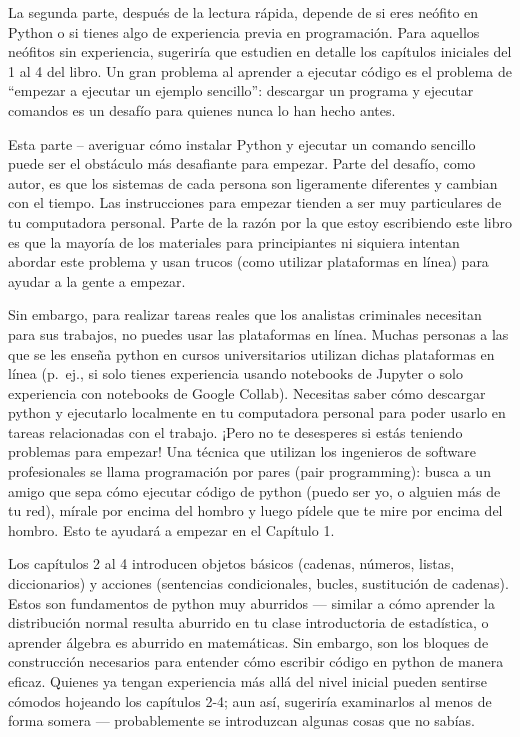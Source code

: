 \documentclass[
  letterpaper,
]{scrbook}
\begin{document}
La segunda parte, después de la lectura rápida, depende de si eres
neófito en Python o si tienes algo de experiencia previa en
programación. Para aquellos neófitos sin experiencia, sugeriría que
estudien en detalle los capítulos iniciales del 1 al 4 del libro. Un
gran problema al aprender a ejecutar código es el problema de ``empezar
a ejecutar un ejemplo sencillo'': descargar un programa y ejecutar
comandos es un desafío para quienes nunca lo han hecho antes.

Esta parte -- averiguar cómo instalar Python y ejecutar un comando
sencillo puede ser el obstáculo más desafiante para empezar. Parte del
desafío, como autor, es que los sistemas de cada persona son ligeramente
diferentes y cambian con el tiempo. Las instrucciones para empezar
tienden a ser muy particulares de tu computadora personal. Parte de la
razón por la que estoy escribiendo este libro es que la mayoría de los
materiales para principiantes ni siquiera intentan abordar este problema
y usan trucos (como utilizar plataformas en línea) para ayudar a la
gente a empezar.

Sin embargo, para realizar tareas reales que los analistas criminales
necesitan para sus trabajos, no puedes usar las plataformas en línea.
Muchas personas a las que se les enseña python en cursos universitarios
utilizan dichas plataformas en línea (p.~ej., si solo tienes experiencia
usando notebooks de Jupyter o solo experiencia con notebooks de Google
Collab). Necesitas saber cómo descargar python y ejecutarlo localmente
en tu computadora personal para poder usarlo en tareas relacionadas con
el trabajo. ¡Pero no te desesperes si estás teniendo problemas para
empezar! Una técnica que utilizan los ingenieros de software
profesionales se llama programación por pares (pair programming): busca
a un amigo que sepa cómo ejecutar código de python (puedo ser yo, o
alguien más de tu red), mírale por encima del hombro y luego pídele que
te mire por encima del hombro. Esto te ayudará a empezar en el Capítulo
1.

Los capítulos 2 al 4 introducen objetos básicos (cadenas, números,
listas, diccionarios) y acciones (sentencias condicionales, bucles,
sustitución de cadenas). Estos son fundamentos de python muy aburridos
--- similar a cómo aprender la distribución normal resulta aburrido en
tu clase introductoria de estadística, o aprender álgebra es aburrido en
matemáticas. Sin embargo, son los bloques de construcción necesarios
para entender cómo escribir código en python de manera eficaz. Quienes
ya tengan experiencia más allá del nivel inicial pueden sentirse cómodos
hojeando los capítulos 2-4; aun así, sugeriría examinarlos al menos de
forma somera --- probablemente se introduzcan algunas cosas que no
sabías.
\end{document}
